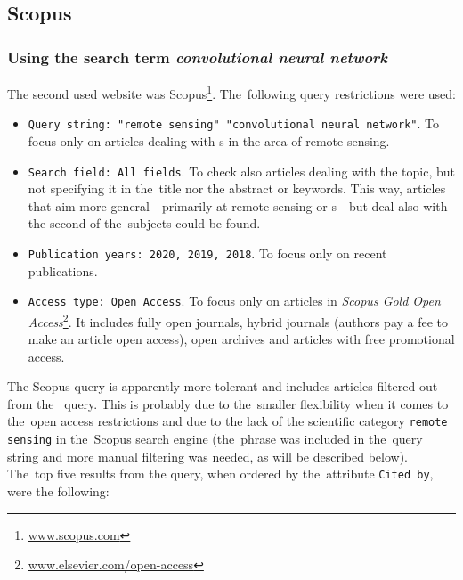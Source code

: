 \subsection{Scopus}
\label{scopus-papers}

\subsubsection{Using the search term \textit{convolutional neural network}}
\label{scopus-papers-full-length}

The second used website was Scopus\footnote{\url{www.scopus.com}}. The~following query restrictions were used:

\begin{itemize}
	\item \verb|Query string: "remote sensing" "convolutional neural network"|. To fo\-cus only on articles dealing with s in the area of remote sensing.
	\item \verb|Search field: All fields|. To check also articles dealing with the topic, but not specifying it in the~title nor the abstract or keywords. This way, articles that aim more general - primarily at remote sensing or s - but deal also with the second of the~subjects could be found.
	\item \verb|Publication years: 2020, 2019, 2018|. To focus only on recent publications.
	\item \verb|Access type: Open Access|. To focus only on articles in \textit{Scopus Gold Open Access}\footnote{\url{www.elsevier.com/open-access}}. It includes fully open journals, hybrid journals (authors pay a fee to make an article open access), open archives and articles with free promotional access.
\end{itemize}

\noindent The Scopus query is apparently more tolerant and includes articles filtered out from the~ query. This is probably due to the~smaller flexibility when it comes to the~open access restrictions and due to the lack of the scientific category \verb|remote sensing| in the~Scopus search engine (the~phrase was included in the~query string and more manual filtering was needed, as will be described below). The~top five results from the query, when ordered by the~attribute \verb|Cited by|, were the following:

